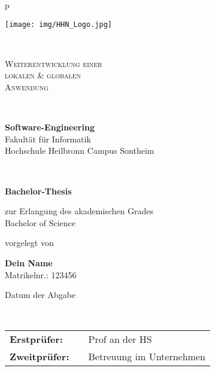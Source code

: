 \begin{center}
\begin{tabular}{p{\textwidth}}



\texttt{[image: img/HHN\_Logo.jpg]}


\\

\begin{center}
\LARGE{\textsc{
Weiterentwicklung einer \\
lokalen \& globalen \\
Anwendung\\
}}
\end{center}

\\


\begin{center}
\large{\textbf{Software-Engineering}\\}
Fakultät für Informatik \\
Hochschule Heilbronn Campus Sontheim \\
\end{center}
\\

\begin{center}
\textbf{\Large{Bachelor-Thesis}}
\end{center}


\begin{center}
zur Erlangung des akademischen Grades\\
Bachelor of Science
\end{center}


\begin{center}
vorgelegt von
\end{center}

\begin{center}
\large{\textbf{Dein Name}} \\
\small{Matrikelnr.: 123456} \\
\end{center}

\begin{center}
\large{Datum der Abgabe}
\end{center}

\\

\begin{center}
\begin{tabular}{lll}
\textbf{Erstprüfer:} & & Prof an der HS\\
\textbf{Zweitprüfer:} & & Betreuung im Unternehmen\\
\end{tabular}
\end{center}
\end{tabular}
\end{center}